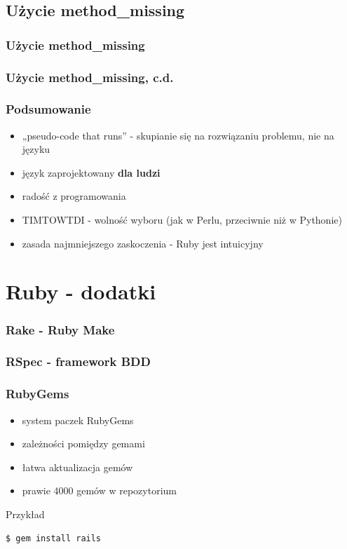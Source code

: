 \documentclass[12t]{beamer}
\begin{document}
\subsection{Użycie method\_missing}
\begin{frame}[fragile]
  \frametitle{Użycie method\_missing}
  
\end{frame}

\begin{frame}[fragile]
  \frametitle{Użycie method\_missing, c.d.}
  
\end{frame}

\begin{frame}
  \frametitle{Podsumowanie}
  \begin{itemize}
  \item „pseudo-code that runs” - skupianie się na rozwiązaniu
    problemu, nie na języku
  \item język zaprojektowany \textbf{dla ludzi}
  \item radość z programowania
  \item TIMTOWTDI - wolność wyboru (jak w Perlu, przeciwnie niż w
    Pythonie)
  \item zasada najmniejszego zaskoczenia - Ruby jest intuicyjny
  \end{itemize}
\end{frame}

\section{Ruby - dodatki}
\begin{frame}[fragile]
  \frametitle{Rake - Ruby Make}
  \begin{footnotesize}
    
  \end{footnotesize}
\end{frame}

\begin{frame}[fragile]
  \frametitle{RSpec - framework BDD}
  \begin{footnotesize}
    
  \end{footnotesize}
\end{frame}

\begin{frame}[fragile]
  \frametitle{RubyGems}
  \begin{itemize}
  \item system paczek RubyGems
  \item zależności pomiędzy gemami
  \item łatwa aktualizacja gemów
  \item prawie 4000 gemów w repozytorium
  \end{itemize}
  \begin{block}{Przykład}
\begin{verbatim}
$ gem install rails
\end{verbatim}
  \end{block}
\end{frame}
\end{document}
